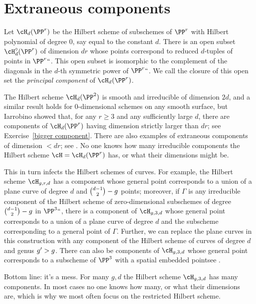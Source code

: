 \section{Extraneous components}

Let $\cH_d(\PP^r)$ be the Hilbert scheme of subschemes of $\PP^r$
with Hilbert polynomial of degree 0, say equal to the constant $d$.
There is an open subset $\cH^\circ_d(\PP^r)$ of dimension $dr$ whose
points correspond to reduced $d$-tuples of points in $\PP^r` `$. This
open subset is isomorphic to the complement of the diagonals in the
$d$-th symmetric power of $\PP^r` `$. We call the closure of this open
set the \emph{principal component} of $\cH_d(\PP^r)$.
%

The Hilbert scheme  $\cH_d(\PP^2)$ is smooth and irreducible of dimension
$2d$, and a similar result holds for
0-dimensional schemes on any smooth surface, but Iarrobino
\citeyear{Iarrobino1985}
%
showed
that, for any $r \geq 3$ and any sufficiently large $d$, there are
components of $\cH_d(\PP^r)$ having dimension strictly larger than $dr$;
%
see Exercise~\ref{bigger component}. There are
also examples of extraneous components
%
of dimension $<dr$; see \cite{MR2579394}. No one knows how many
irreducible components the Hilbert scheme $\cH = \cH_d(\PP^r)$ has,
or what their dimensions might be.

This in turn infects the Hilbert schemes of curves. For example,
the Hilbert scheme $\cH_{g,r,d}$ has a component whose general point
%
corresponds to a union of a plane curve of degree $d$ and $\tbinom{d-1}{2}
- g$ points; moreover, if $\Gamma$ is any irreducible component of the
Hilbert scheme of zero-dimensional subschemes of degree $\tbinom{d-1}{2} -
g$ in $\PP^3` `$, there is a component of $\cH_{g,3,d}$ whose  general point
corresponds to a union of a plane curve of degree $d$ and the subscheme
corresponding to a general point of $\Gamma$. Further, we can replace the
plane curves in this construction with any component of the Hilbert scheme
of curves of degree $d$ and genus $g'>\nobreak g$. There can also be components
of $\cH_{g,3,d}$ whose general point corresponds to a subscheme of $\PP^3$
with a spatial embedded point\emdash see \cite{Chen-Nollet}.

Bottom line: it's a mess. For many $g,d$ the Hilbert scheme $\cH_{g,3,d}$
has many components. In most cases no one knows how many, or what their
dimensions are, which is why we most often focus on the restricted
Hilbert scheme.


